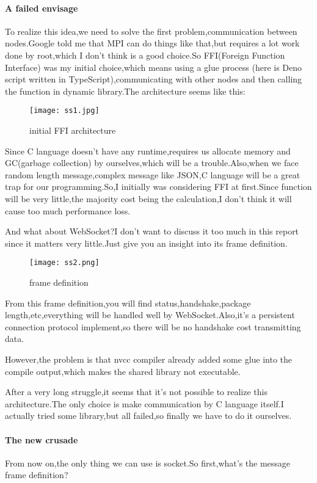 \documentclass[12pt]{scrartcl} %
\begin{document}
\paragraph{A failed envisage}\;\newline
To realize this idea,we need to solve the first problem,communication between nodes.Google told me that MPI can do things like that,but requires a lot work done by root,which I don't think is a good choice.So FFI(Foreign Function Interface) was my initial choice,which means using a glue process (here is Deno script written in TypeScript),communicating with other nodes and then calling the function in dynamic library.The architecture seems like this:
\begin{figure}[H]
    \centering
    \texttt{[image: ss1.jpg]}
    \caption{initial FFI architecture}
    \label{}
\end{figure}

Since C language doesn't have any runtime,requires us allocate memory and GC(garbage collection) by ourselves,which will be a trouble.Also,when we face random length message,complex message like JSON,C language will be a great trap for our programming.So,I initially was considering FFI at first.Since function will be very little,the majority cost being the calculation,I don't think it will cause too much performance loss.

And what about WebSocket?I don't want to discuss it too much in this report since it matters very little.Just give you an insight into its frame definition.
\begin{figure}[H]
    \centering
    \texttt{[image: ss2.png]}
    \caption{frame definition}
    \label{}
\end{figure}

From this frame definition,you will find status,handshake,package length,etc,everything will be handled well by WebSocket.Also,it's a persistent connection protocol implement,so there will be no handshake cost transmitting data.

However,the problem is that nvcc compiler already added some glue into the compile output,which makes the shared library not executable.

After a very long struggle,it seems that it's not possible to realize this architecture.The only choice is make communication by C language itself.I actually tried some library,but all failed,so finally we have to do it ourselves.
\paragraph{The new crusade}\;\newline
From now on,the only thing we can use is socket.So first,what's the message frame definition?
\end{document}

